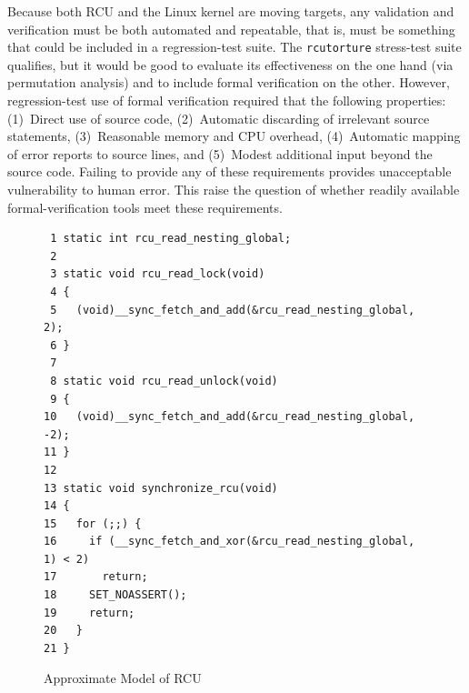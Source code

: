 \documentclass[conference]{IEEEtran}
\newcommand{\co}[1]{\lstinline[breaklines=yes,breakatwhitespace=yes]{#1}}
\begin{document}

Because both RCU and the Linux kernel are moving targets, any validation
and verification must be both automated and repeatable, that is, must be
something that could be included in a regression-test suite.
The \co{rcutorture} stress-test suite qualifies, but it would be
good to evaluate its effectiveness on the one hand
(via permutation analysis)
and to include formal verification on the other.
However, regression-test use of formal verification required that
the following properties:
(1)~Direct use of source code,
(2)~Automatic discarding of irrelevant source statements,
(3)~Reasonable memory and CPU overhead,
(4)~Automatic mapping of error reports to source lines, and
(5)~Modest additional input beyond the source code.
Failing to provide any of these requirements provides unacceptable
vulnerability to human error.
This raise the question of whether readily available formal-verification
tools meet these requirements.

\begin{figure}[tb]
{ \scriptsize
\begin{verbatim}
 1 static int rcu_read_nesting_global;
 2 
 3 static void rcu_read_lock(void)
 4 {
 5   (void)__sync_fetch_and_add(&rcu_read_nesting_global, 2);
 6 }
 7 
 8 static void rcu_read_unlock(void)
 9 {
10   (void)__sync_fetch_and_add(&rcu_read_nesting_global, -2);
11 }
12 
13 static void synchronize_rcu(void)
14 {
15   for (;;) {
16     if (__sync_fetch_and_xor(&rcu_read_nesting_global, 1) < 2)
17       return;
18     SET_NOASSERT();
19     return;
20   }
21 }
\end{verbatim}
}
\caption{Approximate Model of RCU}
\label{fig:Approximate Model of RCU}
\end{figure}
\end{document}
